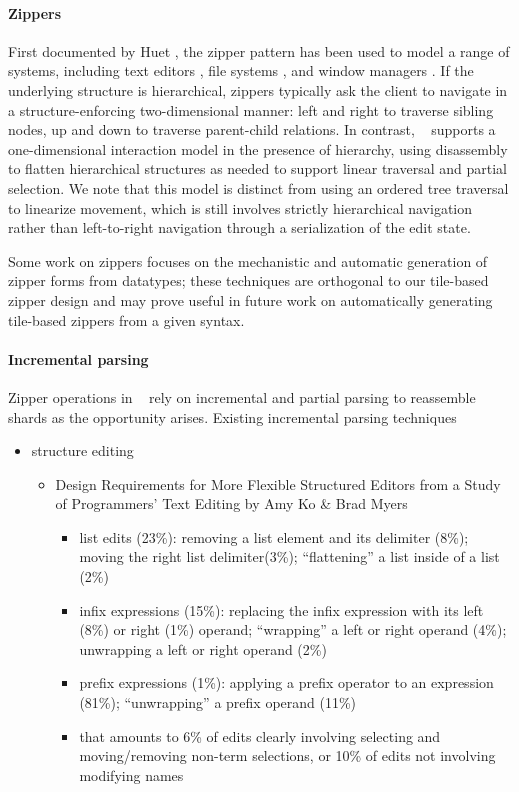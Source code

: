 \paragraph{Zippers}
First documented by Huet
\cite{zipper}, the zipper pattern has been used to model a range of systems,
including text editors \cite{lazy-functional-incremental-parsing},
file systems \cite{zipper-fs}, and window managers \cite{window-manager}.
If the underlying structure is hierarchical,
zippers typically ask the client to navigate
in a structure-enforcing two-dimensional manner: left and right to traverse
sibling nodes, up and down to traverse parent-child relations.
In contrast, \ty~ supports a one-dimensional interaction model
in the presence of hierarchy, using disassembly to flatten
hierarchical structures as needed to support linear traversal
and partial selection.
We note that this model is distinct from using an ordered tree
traversal to linearize movement, which is still involves
strictly hierarchical navigation rather than
left-to-right navigation through a serialization of the edit state.

Some work on zippers focuses on the mechanistic \cite{derivative-zippers,clowns-jokers}
and automatic \cite{syz} generation of zipper forms
from datatypes;
these techniques are orthogonal to our tile-based zipper design
and may prove useful in future work on
automatically generating tile-based zippers
from a given syntax.

\paragraph{Incremental parsing}
Zipper operations in \ty~ rely on incremental and partial
parsing to reassemble shards as the opportunity arises.
Existing incremental parsing techniques


\begin{itemize}
  \item structure editing
  \begin{itemize}
    \item Design Requirements for More Flexible Structured Editors from a Study of Programmers' Text Editing
      by Amy Ko \& Brad Myers
    \begin{itemize}
        \item list edits (23\%):
          removing a list element and its delimiter (8\%);
          moving the right list delimiter(3\%);
          ``flattening'' a list inside of a list (2\%)
        \item infix expressions (15\%):
            replacing the infix expression with its left (8\%) or right (1\%) operand;
            ``wrapping'' a left or right operand (4\%);
            unwrapping a left or right operand (2\%)
        \item prefix expressions (1\%):
            applying a prefix operator to an expression (81\%);
            ``unwrapping'' a prefix operand (11\%)
        \item that amounts to 6\% of edits clearly involving selecting and
          moving/removing non-term selections, or 10\% of edits not involving
          modifying names
    \end{itemize}
  \end{itemize}
\end{itemize}